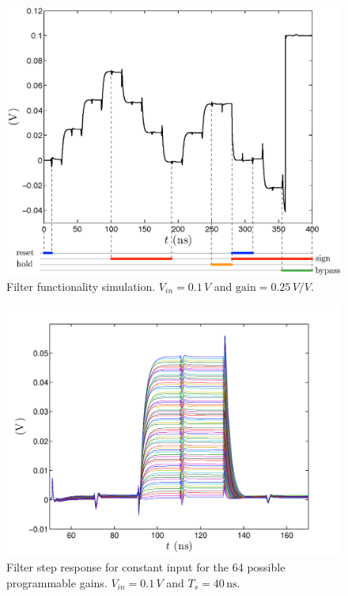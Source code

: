 \begin{figure}[!t]
	\centering
	\includegraphics[width=5in]{./Test/test_filter_after_omni.eps}
	\caption{Filter functionality simulation. $V_\textit{in}=0.1\,V$ and $\text{gain}=0.25\,V/V$.}\label{fig:test_filter_after_omni}
\end{figure}

\begin{figure}[!t]
	\centering
	\includegraphics[width=4.4in]{./Test/gain_curves.pdf}
	\caption[Filter step response for constant input for the 64 possible programmable gains.]{Filter step response for constant input for the 64 possible programmable gains. \mbox{$V_\textit{in}=0.1\,V$} and \mbox{$T_s=40\,\text{ns}$}.}\label{fig:gain_curves}
\end{figure}

